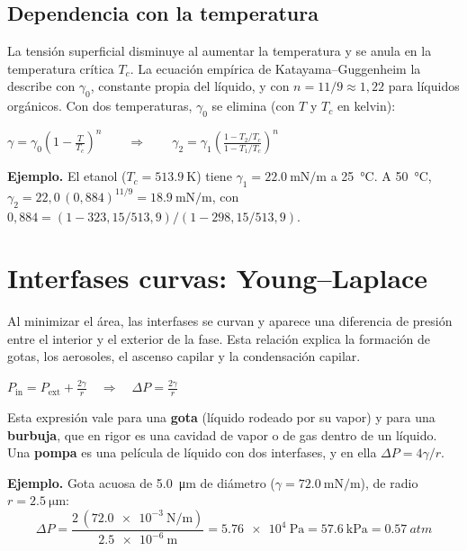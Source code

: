 \documentclass[10pt,letterpaper]{article}
\begin{document}
\subsection*{Dependencia con la temperatura}
La tensión superficial disminuye al aumentar la temperatura y se anula en la temperatura crítica $T_c$. La ecuación empírica de Katayama--Guggenheim la describe con $\gamma_0$, constante propia del líquido, y con $n=11/9\approx1{,}22$ para líquidos orgánicos. Con dos temperaturas, $\gamma_0$ se elimina (con $T$ y $T_c$ en kelvin):
\begin{clave}
$\displaystyle \gamma=\gamma_0\left(1-\frac{T}{T_c}\right)^{n}\qquad\Rightarrow\qquad \gamma_2=\gamma_1\left(\frac{1-T_2/T_c}{1-T_1/T_c}\right)^{n}$
\end{clave}
\begin{apoyo}\small\textbf{Ejemplo.} El etanol ($T_c=\SI{513,9}{\kelvin}$) tiene $\gamma_1=\SI{22,0}{\milli\newton\per\meter}$ a \SI{25}{\celsius}. A \SI{50}{\celsius}, $\gamma_2=22{,}0\,(0{,}884)^{11/9}=\SI{18,9}{\milli\newton\per\meter}$, con $0{,}884=(1-323{,}15/513{,}9)/(1-298{,}15/513{,}9)$.
\end{apoyo}

\clearpage
\section{Interfases curvas: Young--Laplace}
Al minimizar el área, las interfases se curvan y aparece una diferencia de presión entre el interior y el exterior de la fase. Esta relación explica la formación de gotas, los aerosoles, el ascenso capilar y la condensación capilar.
\begin{clave}
$\displaystyle P_{\mathrm{in}}=P_{\mathrm{ext}}+\frac{2\gamma}{r}\quad\Rightarrow\quad\Delta P=\frac{2\gamma}{r}$
\end{clave}
Esta expresión vale para una \textbf{gota} (líquido rodeado por su vapor) y para una \textbf{burbuja}, que en rigor es una cavidad de vapor o de gas dentro de un líquido. Una \textbf{pompa} es una película de líquido con dos interfases, y en ella $\Delta P=4\gamma/r$.
\begin{apoyo}\small\textbf{Ejemplo.} Gota acuosa de \SI{5,0}{\micro\meter} de diámetro ($\gamma=\SI{72,0}{\milli\newton\per\meter}$), de radio $r=\SI{2,5}{\micro\meter}$:
\[\Delta P=\frac{2\,(\SI{72,0e-3}{\newton\per\meter})}{\SI{2,5e-6}{\meter}}=\SI{5,76e4}{\pascal}=\SI{57,6}{\kilo\pascal}=\SI{0,57}{atm}\]
\end{apoyo}
\end{document}
